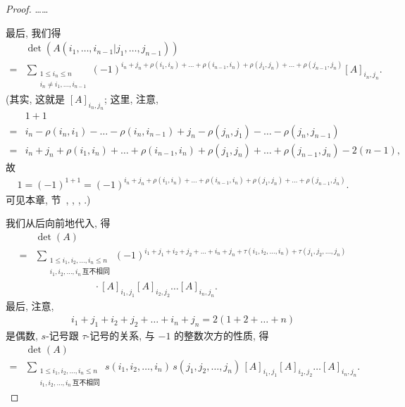 \documentclass[../libro.tex]{subfiles}
\begin{document}
\begin{proof}
    ……

    最后, 我们得
    \begin{align*}
        &
        \det {(A({i_1,\dots,i_{n-1}}|{j_1,\dots,j_{n-1}}))}
        \\
        = {} &
        \sum_{\substack{
                1 \leq i_n \leq n \\
                i_n \neq i_1, \dots, i_{n-1}
        }}
        {(-1)^{i_n + j_n
                + \rho(i_1, i_n) + \dots + \rho(i_{n-1}, i_n)
            + \rho(j_1, j_n) + \dots + \rho(j_{n-1}, j_n)}
        [A]_{i_n,j_n}}.
    \end{align*}
    (其实, 这就是 \([A]_{i_n,j_n}\); %
    这里, 注意,
    \begin{align*}
        & 1 + 1
        \\
        = {} &
        i_n - \rho(i_n, i_1) - \dots - \rho(i_n, i_{n-1})
        + j_n - \rho(j_n, j_1) - \dots - \rho(j_n, j_{n-1})
        \\
        = {} &
        i_n + j_n
        + \rho(i_1, i_n) + \dots + \rho(i_{n-1}, i_n)
        + \rho(j_1, j_n) + \dots + \rho(j_{n-1}, j_n)
        - 2(n-1),
    \end{align*}
    故
    \begin{align*}
        1 = (-1)^{1+1}
        = (-1)^{i_n + j_n
            + \rho(i_1, i_n) + \dots + \rho(i_{n-1}, i_n)
        + \rho(j_1, j_n) + \dots + \rho(j_{n-1}, j_n)}.
    \end{align*}
    可见本章, 节~,
    ,
    ,
    .) %

    我们从后向前地代入, 得
    \begin{align*}
        & \det {(A)}
        \\
        = {} & \sum_{\substack{
                1 \leq i_1, i_2, \dots, i_n \leq n \\
                i_1, i_2, \dots, i_n\,\text{互不相同}
        }}
        {(-1)^{i_1 + j_1 + i_2 + j_2 + \dots + i_n + j_n
                + \tau(i_1, i_2, \dots, i_n)
        + \tau(j_1, j_2, \dots, j_n)}}
        \\
        &
        \qquad \qquad \qquad
        \cdot
        [A]_{i_1,j_1} [A]_{i_2,j_2} \dots [A]_{i_n,j_n}.
    \end{align*}
    最后, 注意,
    \begin{align*}
        i_1 + j_1 + i_2 + j_2 + \dots + i_n + j_n
        = 2(1 + 2 + \dots + n)
    \end{align*}
    是偶数,
    \(s\)-记号跟 \(\tau\)-记号的关系,
    与 \(-1\) 的整数次方的性质,
    得
    \begin{align*}
        & \det {(A)}
        \\
        = {} &
        \sum_{\substack{
                1 \leq i_1, i_2, \dots, i_n \leq n \\
                i_1, i_2, \dots, i_n\,\text{互不相同}
        }}
        {s(i_1, i_2, \dots, i_n)\,
            s(j_1, j_2, \dots, j_n)\,
        [A]_{i_1,j_1} [A]_{i_2,j_2} \dots [A]_{i_n,j_n}}.
    \end{align*}
\end{proof}
\end{document}
